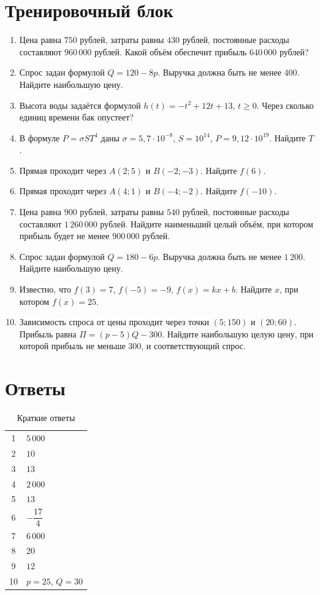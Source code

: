 \documentclass[a4paper,12pt]{article}
\begin{document}
\section*{Тренировочный блок}
\begin{enumerate}
\item Цена равна $750$ рублей, затраты равны $430$ рублей, постоянные расходы составляют $960\,000$ рублей. Какой объём обеспечит прибыль $640\,000$ рублей?
\item Спрос задан формулой $Q=120-8p$. Выручка должна быть не менее $400$. Найдите наибольшую цену.
\item Высота воды задаётся формулой $h(t)=-t^2+12t+13$, $t\ge0$. Через сколько единиц времени бак опустеет?
\item В формуле $P=\sigma ST^4$ даны $\sigma=5{,}7\cdot10^{-8}$, $S=10^{14}$, $P=9{,}12\cdot10^{19}$. Найдите $T$.
\item Прямая проходит через $A(2;5)$ и $B(-2;-3)$. Найдите $f(6)$.
\item Прямая проходит через $A(4;1)$ и $B(-4;-2)$. Найдите $f(-10)$.
\item Цена равна $900$ рублей, затраты равны $540$ рублей, постоянные расходы составляют $1\,260\,000$ рублей. Найдите наименьший целый объём, при котором прибыль будет не менее $900\,000$ рублей.
\item Спрос задан формулой $Q=180-6p$. Выручка должна быть не менее $1\,200$. Найдите наибольшую цену.
\item Известно, что $f(3)=7$, $f(-5)=-9$, $f(x)=kx+b$. Найдите $x$, при котором $f(x)=25$.
\item Зависимость спроса от цены проходит через точки $(5;150)$ и $(20;60)$. Прибыль равна $\Pi=(p-5)Q-300$. Найдите наибольшую целую цену, при которой прибыль не меньше $300$, и соответствующий спрос.
\end{enumerate}
\clearpage
\section*{Ответы}
\begin{table}[ht]\centering\caption{Краткие ответы}\begin{tabularx}{\linewidth}{@{}cX@{}}\toprule
1 & $5\,000$\\
2 & $10$\\
3 & $13$\\
4 & $2\,000$\\
5 & $13$\\
6 & $-\dfrac{17}{4}$\\
7 & $6\,000$\\
8 & $20$\\
9 & $12$\\
10 & $p=25$, $Q=30$\\\bottomrule\end{tabularx}\end{table}
\end{document}
